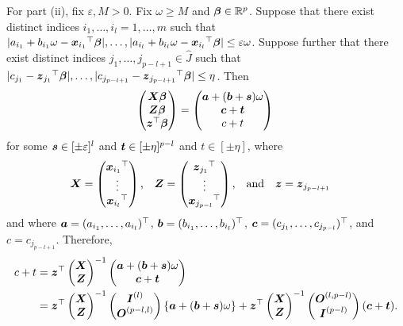\documentclass[12pt]{article}
\def\ep{{\varepsilon}}
\def\ep{{\varepsilon}}
\def\om{{\omega}}
\def\non{{\nonumber}}
\def\ep{{\varepsilon}}
\def\om{{\omega}}
\def\bbe{{\text{\boldmath $\beta$}}}
\def\a{{\text{\boldmath $a$}}}
\def\b{{\text{\boldmath $b$}}}
\def\c{{\text{\boldmath $c$}}}
\def\s{{\text{\boldmath $s$}}}
\def\t{{\text{\boldmath $t$}}}
\def\x{{\text{\boldmath $x$}}}
\def\z{{\text{\boldmath $z$}}}
\def\I{{\text{\boldmath $I$}}}
\def\O{{\text{\boldmath $O$}}}
\def\X{{\text{\boldmath $X$}}}
\def\Z{{\text{\boldmath $Z$}}}
\def\Jh{{\widehat J}}
\def\non{{\nonumber}}
\begin{document}
For part (ii), fix $\ep , M > 0$. 
Fix $\om \ge M$ and $\bbe \in \mathbb{R} ^p$. 
Suppose that there exist distinct indices $i_1 , \dots , i_l = 1, \dots , m$ such that $| a_{i_1} + b_{i_1} \om - {\x _{i_1}}^{\top } \bbe |, \dots , | a_{i_l} + b_{i_l} \om - {\x _{i_l}}^{\top } \bbe | \le \ep \om $. 
Suppose further that there exist distinct indices $j_1 , \dots , j_{p - l + 1} \in \Jh $ such that $| c_{j_1} - {\z _{j_1}}^{\top } \bbe |, \dots , | c_{j_{p - l + 1}} - {\z _{j_{p - l + 1}}}^{\top } \bbe | \le \eta $. 
Then 
\begin{align}
\begin{pmatrix} \X \bbe \\ \Z \bbe \\ \z ^{\top } \bbe \end{pmatrix} = \begin{pmatrix} \a + ( \b + \s ) \om \\ \c + \t \\ c + t \end{pmatrix} \non 
\end{align}
for some $\s \in [ \pm \ep ]^l$ and $\t \in [ \pm \eta ]^{p - l}$ and $t \in [ \pm \eta ]$, where 
\begin{align}
&\X = \begin{pmatrix} {\x _{i_1}}^{\top } \\ \vdots \\ {\x _{i_l}}^{\top } \end{pmatrix} \text{,} \quad \Z = \begin{pmatrix} {\z _{j_1}}^{\top } \\ \vdots \\ {\x _{j_{p - l}}}^{\top } \end{pmatrix} \text{,} \quad \text{and} \quad \z = \z _{j_{p - l + 1}} \non 
\end{align}
and where $\a = ( a_{i_1} , \dots , a_{i_l} )^{\top }$, $\b = ( b_{i_1} , \dots , b_{i_l} )^{\top }$, $\c = ( c_{j_1} , \dots , c_{j_{p - l}} )^{\top }$, and $c = c_{j_{p - l + 1}}$. 
Therefore, 
\begin{align}
c + t &= \z ^{\top } \begin{pmatrix} \X \\ \Z \end{pmatrix} ^{- 1} \begin{pmatrix} \a + ( \b + \s ) \om \\ \c + \t \end{pmatrix} \non \\
&= \z ^{\top } \begin{pmatrix} \X \\ \Z \end{pmatrix} ^{- 1} \begin{pmatrix} \I ^{(l)} \\ \O ^{(p - l, l)} \end{pmatrix} \{  \a + ( \b + \s ) \om \} + \z ^{\top } \begin{pmatrix} \X \\ \Z \end{pmatrix} ^{- 1} \begin{pmatrix} \O ^{(l, p - l)} \\ \I ^{(p - l)} \end{pmatrix} ( \c + \t ) \text{.} \non 
\end{align}
\end{document}
